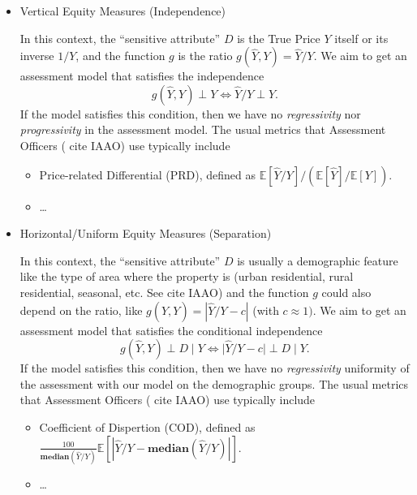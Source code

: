 \documentclass[11pt]{article}
\theoremstyle{plain}
\theoremstyle{definition}
\newcommand{\1}{\mathbf{1}}
\newcommand{\qt}[1]{``#1''}
\newcommand{\Expected}[1]{\mathbb{E}[#1]}
\begin{document}
\begin{itemize}
    \item {Vertical Equity Measures (Independence)} 
    
     In this context, the \qt{sensitive attribute} $D$ is the True Price $Y$ itself or its inverse $1/Y$, and the function $g$ is the ratio $g(\hat{Y}, Y)={\hat{Y}}/{Y}$. We aim to get an assessment model that satisfies the independence $$g(\hat{Y}, Y)\perp Y \iff \hat{Y}/Y\perp Y.$$ 
     If the model satisfies this condition, then we have no \textit{regressivity} nor \textit{progressivity} in the assessment model. The usual metrics that Assessment Officers ({\color{red} cite IAAO}) use typically include 
    \begin{itemize}
        \item Price-related Differential (PRD), defined as $\Expected{\hat{Y}/Y}/ (\Expected{\hat{Y}} / \Expected{Y})$.
        \item \ldots
    \end{itemize}

    \item {Horizontal/Uniform Equity Measures (Separation)}
    
 In this context, the \qt{sensitive attribute} $D$ is usually a demographic feature like the type of area where the property is (urban residential, rural residential, seasonal, etc. See {\color{red} cite IAAO}) and the function $g$ could also depend on the ratio, like $g(\hat{Y}, Y)=|{\hat{Y}}/{Y}-c|$ (with $c\approx 1)$. We aim to get an assessment model that satisfies the conditional independence $$g(\hat{Y}, Y)\perp D\;|\; Y \iff  |\hat{Y}/Y-c|\perp D \;|\; Y.$$
      If the model satisfies this condition, then we have no \textit{regressivity} uniformity of the assessment with our model on the demographic groups. The usual metrics that Assessment Officers ({\color{red} cite IAAO}) use typically include 
    \begin{itemize}
        \item Coefficient of Dispertion (COD), defined as $\frac{100}{\textbf{median}(\hat{Y}/Y)} \Expected{|\hat{Y}/Y - \textbf{median}(\hat{Y}/Y)|} $.
        \item \ldots
    \end{itemize}
    
\end{itemize}
\end{document}
